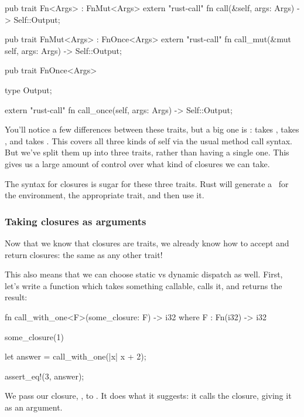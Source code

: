 \begin{rustc}
pub trait Fn<Args> : FnMut<Args> {
    extern "rust-call" fn call(&self, args: Args) -> Self::Output;
}

pub trait FnMut<Args> : FnOnce<Args> {
    extern "rust-call" fn call_mut(&mut self, args: Args) -> Self::Output;
}

pub trait FnOnce<Args> {
    type Output;

    extern "rust-call" fn call_once(self, args: Args) -> Self::Output;
}
\end{rustc}

You'll notice a few differences between these traits, but a big one is :  takes ,  takes 
, and  takes . This covers all three kinds of self via the usual method call syntax. But we've 
split them up into three traits, rather than having a single one. This gives us a large amount of control over what kind of closures we 
can take.

\blank

The \code{|| \{\}} syntax for closures is sugar for these three traits. Rust will generate a \struct\ for the environment,  
the appropriate trait, and then use it.

\subsubsection*{Taking closures as arguments}

Now that we know that closures are traits, we already know how to accept and return closures: the same as any other trait!

\blank

This also means that we can choose static vs dynamic dispatch as well. First, let's write a function which takes something callable, 
calls it, and returns the result:

\begin{rustc}
fn call_with_one<F>(some_closure: F) -> i32
    where F : Fn(i32) -> i32 {

    some_closure(1)
}

let answer = call_with_one(|x| x + 2);

assert_eq!(3, answer);
\end{rustc}

We pass our closure, , to . It does what it suggests: it calls the closure, giving it  as 
an argument.

